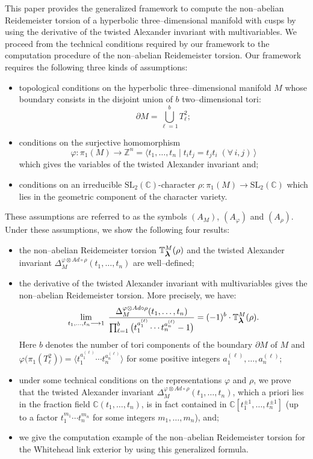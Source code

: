 \documentclass[a4paper]{amsart}
\theoremstyle{plain}
\theoremstyle{definition}
\theoremstyle{remark}
\newcommand{\ZZ}{{\mathbb Z}}
\newcommand{\CC}{{\mathbb C}}
\newcommand{\SL}{{\mathrm{SL}_2(\CC)}}
\newcommand{\smallbm}[1]{\mbox{\small \boldmath $#1$}}
\newcommand{\PolyTors}[2]{\Delta_{#1}^{#2}}
\newcommand{\RTors}[2]{\mathbb{T}^{#1}_{#2}}
\newcommand{\otAd}[2]{#1 \otimes Ad \circ #2}
\begin{document}
This paper provides the generalized framework to compute the non--abelian Reidemeister torsion of a hyperbolic three--dimensional manifold with cusps 
by using the derivative of the twisted Alexander invariant with multivariables.
We proceed from the technical conditions required by our framework to the computation procedure of 
the non--abelian Reidemeister torsion.
Our framework requires the following three kinds of assumptions:
\begin{itemize}
\item topological conditions on the hyperbolic three--dimensional manifold $M$ whose boundary consists in the disjoint union of $b$ two--dimensional tori: $$\partial M = \bigcup_{\ell =1}^b T_\ell^2;$$
\item conditions on the surjective homomorphism $$\varphi\colon \pi_1(M) \to \ZZ^n = \langle t_1, \ldots, t_n \; |\; t_it_j = t_jt_i \;(\forall\, i,j)\,\rangle$$ which gives the variables of the twisted Alexander invariant and;
\item conditions on an irreducible $\SL$-character $\rho\colon \pi_1(M) \to \SL$ which lies in the geometric component of the character variety.
\end{itemize}
These assumptions are referred to as the symbols $(A_M)$,
$(A_\varphi)$ and $(A_\rho)$.  Under these assumptions, we show the following four results:
\begin{itemize}
\item the non--abelian Reidemeister torsion $\RTors{M}{\smallbm{\lambda}}(\rho)$ and the twisted Alexander
  invariant $\PolyTors{M}{\otAd{\varphi}{\rho}}(t_1, \ldots, t_n)$ are well--defined;
\item the derivative of the twisted Alexander invariant with
  multivariables gives the non--abelian Reidemeister torsion. More precisely, we have:
  \[
  \lim_{t_1, \ldots, t_n \longrightarrow 1}\; 
    \frac{
      \PolyTors{M}{\otAd{\varphi}{\rho}}(t_1, \ldots, t_n)
    }{
      \prod_{\ell = 1}^b \big( t_1^{a_1^{(\ell)}} \cdots t_n^{a_n^{(\ell)}} - 1 \big )
    } 
    = (-1)^b \cdot \RTors{M}{\smallbm{\lambda}}(\rho).
    \]
    Here $b$ denotes the number of tori components of the boundary $\partial M$ of $M$ and $\varphi\big(\pi_1(T_\ell^2)\big) = \big\langle t_1^{a_1^{(\ell)}} \cdots
  t_n^{a_n^{(\ell)}}\big \rangle$ for some positive integers $a_1^{(\ell)}, \ldots, a_n^{(\ell)}$;
  \item under some technical conditions on the representations $\varphi$ and $\rho$, we prove that the twisted Alexander invariant $\PolyTors{M}{\otAd{\varphi}{\rho}}(t_1, \ldots, t_n)$, which a priori lies in the fraction field $\CC(t_1, \ldots, t_n)$, is in fact  contained in $\CC[t_1^{\pm 1}, \ldots, t_n^{\pm 1}]$ (up to a factor $t_1^{m_1} \cdots t_n^{m_n}$ for some integers $m_1, \ldots, m_n$), and;
\item we give the computation example of the non--abelian Reidemeister
  torsion for the Whitehead link exterior by using this generalized
  formula.
\end{itemize}
\end{document}

